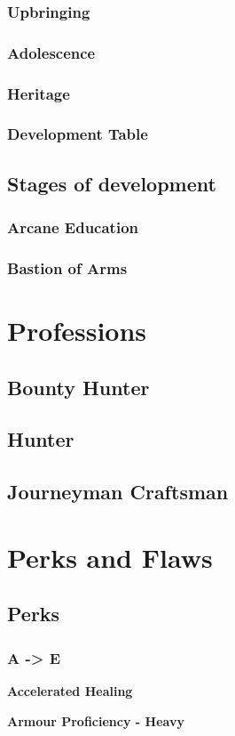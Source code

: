 \documentclass[12pt]{article}
\newcommand{\subsubsubsection}[1]{%
  \vspace{1em} %
  \noindent\textbf{\small #1}\par
  \vspace{0.5em} %
}
\begin{document}
\subsubsection{Upbringing}
\subsubsection{Adolescence}
\subsubsection{Heritage}
\subsubsection{Development Table}
\subsection{Stages of development}
\subsubsection{Arcane Education}
\subsubsection{Bastion of Arms}
\section{Professions}
\subsection{Bounty Hunter}
\subsection{Hunter}
\subsection{Journeyman Craftsman}
\section{Perks and Flaws}
\subsection{Perks}
\subsubsection{A -> E}
\subsubsubsection{Accelerated Healing}
\subsubsubsection{Armour Proficiency - Heavy}
\end{document}
